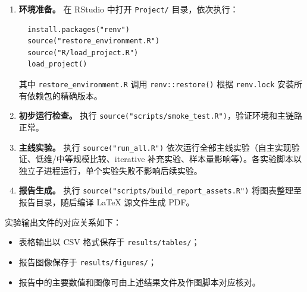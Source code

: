 \documentclass[UTF8,a4paper,12pt]{ctexart}
\begin{document}
\begin{enumerate}[label=(\arabic*)]
  \item \textbf{环境准备。} 在 RStudio 中打开 \texttt{Project/} 目录，依次执行：
  \begin{verbatim}
  install.packages("renv")
  source("restore_environment.R")
  source("R/load_project.R")
  load_project()
  \end{verbatim}
  其中 \texttt{restore\_environment.R} 调用 \texttt{renv::restore()} 根据 \texttt{renv.lock} 安装所有依赖包的精确版本。

  \item \textbf{初步运行检查。} 执行 \texttt{source("scripts/smoke\_test.R")}，验证环境和主链路正常。

  \item \textbf{主线实验。} 执行 \texttt{source("run\_all.R")} 依次运行全部主线实验（自主实现验证、低维/中等规模比较、iterative 补充实验、样本量影响等）。各实验脚本以独立子进程运行，单个实验失败不影响后续实验。

  \item \textbf{报告生成。} 执行 \texttt{source("scripts/build\_report\_assets.R")} 将图表整理至报告目录，随后编译 LaTeX 源文件生成 PDF。
\end{enumerate}

实验输出文件的对应关系如下：
\begin{itemize}
  \item 表格输出以 CSV 格式保存于 \texttt{results/tables/}；
  \item 报告图像保存于 \texttt{results/figures/}；
  \item 报告中的主要数值和图像可由上述结果文件及作图脚本对应核对。
\end{itemize}
\end{document}
